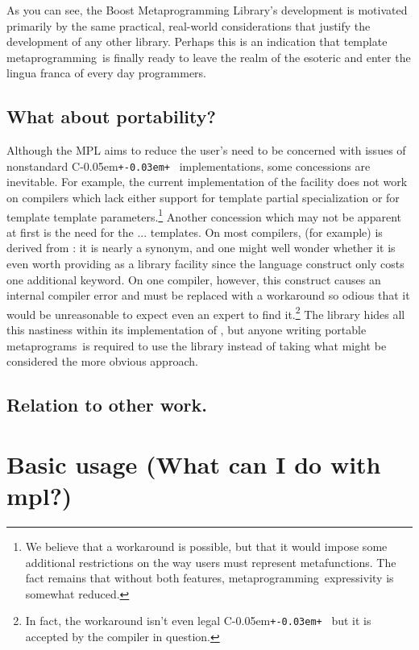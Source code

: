 \documentclass{kapproc}
\newcommand{\Cpp}{C\kern-0.05em\texttt{+\kern-0.03em+}%
}
\newcommand{\Mpl}{Boost Meta\-pro\-gram\-ming Library}
\newcommand{\mping}{meta\-pro\-gram\-ming}
\newcommand{\mpgms}{meta\-pro\-grams}
\newcommand{\mfn}{meta\-func\-tion}
\begin{document}
As you can see, the \Mpl's development is motivated primarily by the
same practical, real-world considerations that justify the development
of any other library. Perhaps this is an indication that template
\mping\ is finally ready to leave the realm of the esoteric and enter
the lingua franca of every day programmers.

\subsection{What about portability? }

Although the MPL aims to reduce the user's need to be concerned with
issues of nonstandard \Cpp\ implementations, some concessions are
inevitable. For example, the current implementation of the
 facility does not work on compilers which lack either
support for template partial specialization or for template template
parameters.\footnote{We believe that a workaround is possible, but
that it would impose some additional restrictions on the way users
must represent \mfn{}s. The fact remains that without both
features, \mping\ expressivity is somewhat reduced.} Another
concession which may not be apparent at first is the need for the
... templates. On most compilers,
 (for example) is derived from
: it is nearly a synonym, and one
might well wonder whether it is even worth providing  as a
library facility since the language construct only costs one
additional keyword. On one compiler, however, this construct causes an
internal compiler error and must be replaced with a workaround so
odious that it would be unreasonable to expect even an expert to find
it.\footnote{In fact, the workaround isn't even legal \Cpp\, but it is
accepted by the compiler in question.} The library hides all this
nastiness within its implementation of , but anyone
writing portable \mpgms\ is required to use the library instead of
taking what might be considered the more obvious approach.

\subsection{Relation to other work.}

\section{Basic usage (What can I do with mpl?)}
\end{document}
